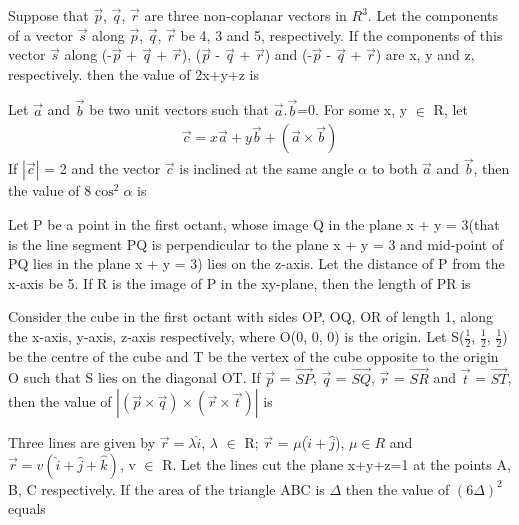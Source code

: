 \item Suppose that $\overrightarrow{p}$, $\overrightarrow{q}$, $\overrightarrow{r}$ are three non-coplanar vectors in $R^{3}$. Let the components of a vector $\overrightarrow{s}$ along $\overrightarrow{p}$, $\overrightarrow{q}$,  
$\overrightarrow{r}$ be 4, 3 and 5, respectively. If the components of this vector $\overrightarrow{s}$ along 
(-$\overrightarrow{p}$ + $\overrightarrow{q}$ + $\overrightarrow{r}$), ($\overrightarrow{p}$ - $\overrightarrow{q}$ + $\overrightarrow{r}$) and (-$\overrightarrow{p}$ - $\overrightarrow{q}$ + $\overrightarrow{r}$) are x, y and z, respectively. then the value of 2x+y+z is

\item Let $\overrightarrow{a}$ and $\overrightarrow{b}$ be two unit vectors such that $\overrightarrow{a}$.$\overrightarrow{b}$=0. For some x, y $\in$ R, let 
\begin{align*}
\overrightarrow{c} = x\overrightarrow{a} + y\overrightarrow{b} + (\overrightarrow{a} \times \overrightarrow{b})
\end{align*}
If $|\overrightarrow{c}|$ = 2 and the vector $\overrightarrow{c}$ is inclined at the same angle $\alpha$ to both $\overrightarrow{a}$ and $\overrightarrow{b}$, then the value of 8$\cos^{2}\alpha$ is

\item Let P be a point in the first octant, whose image Q in the plane x + y = 3(that is the line segment PQ is perpendicular to the plane x + y = 3 and mid-point of PQ lies in the plane x + y = 3) lies on the z-axis. Let the distance of P from the x-axis be 5. If R is the image of P in the xy-plane, then the length of PR is

\item Consider the cube in the first octant with sides OP, OQ, OR of length 1, along the x-axis, y-axis, z-axis respectively, where O(0, 0, 0) is the origin. Let S($\frac{1}{2}$, $\frac{1}{2}$, $\frac{1}{2}$) be the centre of the cube and T be the vertex of the cube opposite to the origin O such that S lies on the diagonal OT. If 
$\overrightarrow{p}$ = $\overrightarrow{SP}$, $\overrightarrow{q}$ = $\overrightarrow{SQ}$, $\overrightarrow{r}$ = $\overrightarrow{SR}$ and $\overrightarrow{t}$ = $\overrightarrow{ST}$, then the value of $|(\overrightarrow{p} \times \overrightarrow{q}) \times (\overrightarrow{r} \times \overrightarrow{t})|$ is

\item Three lines are given by $\overrightarrow{r} = \lambda\hat{i}$, $\lambda$ $\in$ R; $\overrightarrow{r}$ = $\mu$($\hat{i} + \hat{j}$), $\mu \in R$ and $\overrightarrow{r} = v(\hat{i}+\hat{j}+\hat{k})$, v $\in$ R. Let the lines cut the plane x+y+z=1 at the points A, B, C respectively. If the area of the triangle ABC is $\Delta$ then the value of $(6\Delta)^{2}$ equals

